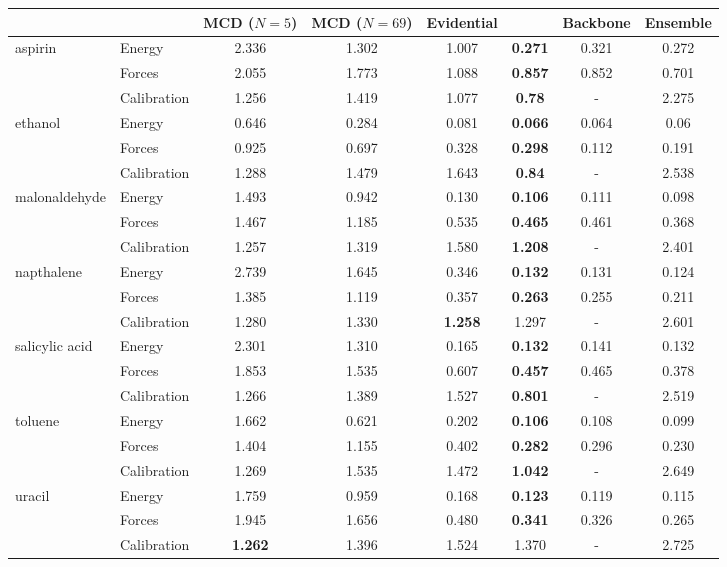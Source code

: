 \begin{tabular}{llcccc|c|c}
\toprule
{} & & MCD ($N=5$) &MCD ($N=69$) & Evidential & \oursacro{} & Backbone & Ensemble \\
\midrule
\multirow{3}{*}{aspirin} & Energy & 2.336 & 1.302 & 1.007 & \textbf{0.271} & 0.321 & 0.272\\ & Forces & 2.055 & 1.773 & 1.088 & \textbf{0.857} & 0.852 & 0.701\\ & Calibration & 1.256 & 1.419 & 1.077 & \textbf{0.78} & - & 2.275\\
\midrule
\multirow{3}{*}{ethanol} & Energy & 0.646 & 0.284 & 0.081 & \textbf{0.066} & 0.064 & 0.06\\ & Forces & 0.925 & 0.697 & 0.328 & \textbf{0.298} & 0.112 & 0.191\\ & Calibration & 1.288 & 1.479 & 1.643 & \textbf{0.84} & - & 2.538\\
\midrule
\multirow{3}{*}{malonaldehyde} & Energy & 1.493 & 0.942 & 0.130 & \textbf{0.106} & 0.111 & 0.098\\ & Forces & 1.467 & 1.185 & 0.535 & \textbf{0.465} & 0.461 & 0.368\\ & Calibration & 1.257 & 1.319 & 1.580 & \textbf{1.208} & - & 2.401\\
\midrule
\multirow{3}{*}{napthalene} & Energy & 2.739 & 1.645 & 0.346 & \textbf{0.132} & 0.131 & 0.124\\ & Forces & 1.385 & 1.119 & 0.357 & \textbf{0.263} & 0.255 & 0.211\\ & Calibration & 1.280 & 1.330 & \textbf{1.258} & 1.297 & - & 2.601\\
\midrule
\multirow{3}{*}{salicylic acid} & Energy & 2.301 & 1.310 & 0.165 & \textbf{0.132} & 0.141 & 0.132\\ & Forces & 1.853 & 1.535 & 0.607 & \textbf{0.457} & 0.465 & 0.378\\ & Calibration & 1.266 & 1.389 & 1.527 & \textbf{0.801} & - & 2.519\\
\midrule
\multirow{3}{*}{toluene} & Energy & 1.662 & 0.621 & 0.202 & \textbf{0.106} & 0.108 & 0.099\\ & Forces & 1.404 & 1.155 & 0.402 & \textbf{0.282} & 0.296 & 0.230\\ & Calibration & 1.269 & 1.535 & 1.472 & \textbf{1.042} & - & 2.649\\
\midrule
\multirow{3}{*}{uracil} & Energy & 1.759 & 0.959 & 0.168 & \textbf{0.123} & 0.119 & 0.115\\ & Forces & 1.945 & 1.656 & 0.480 & \textbf{0.341} & 0.326 & 0.265\\ & Calibration & \textbf{1.262} & 1.396 & 1.524 & 1.370 & - & 2.725\\
\bottomrule
\end{tabular}